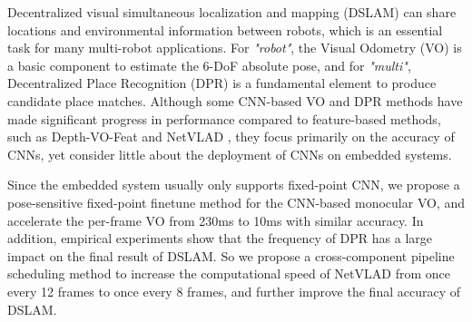 Decentralized visual simultaneous localization and mapping (DSLAM) can share locations and environmental information between robots, which is an essential task for many multi-robot applications. For \textit{"robot"}, the Visual Odometry (VO) is a basic component to estimate the 6-DoF absolute pose, and for \textit{"multi"}, Decentralized Place Recognition (DPR) is a fundamental element to produce candidate place matches.
Although some CNN-based VO and DPR methods have made significant progress in performance compared to feature-based methods, such as Depth-VO-Feat \cite{Zhan:2018e92} and NetVLAD \cite{Arandjelovic:2017997}, they focus primarily  on the accuracy of CNNs, yet consider little about the deployment of CNNs on embedded systems.

Since the embedded system usually only supports fixed-point CNN, we propose a pose-sensitive fixed-point finetune method for the CNN-based monocular VO, and accelerate the per-frame VO from 230ms to 10ms with similar accuracy. In addition, empirical experiments show that the frequency of DPR has a large impact on the final result of DSLAM. So we propose a cross-component pipeline scheduling method to increase the computational speed of NetVLAD from once every 12 frames to once every 8 frames, and further improve the final accuracy of DSLAM.



